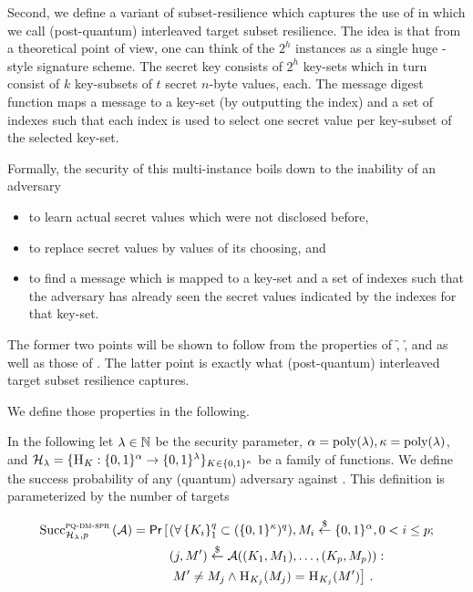 Second, we define a variant of subset-resilience which captures the use
of \fors in \spx which we call (post-quantum)  interleaved target subset resilience.
The idea is that from a theoretical point of view, one can think of the
$2^h$ \fors instances as a single huge \hors-style signature scheme.
The secret key consists of $2^h$ key-sets which in turn consist of $k$
key-subsets of $t$ secret $n$-byte values, each. The message digest function
\sphincsHmsg maps a message to a key-set (by outputting the index) and a set
of indexes such that each index is used to select one secret value per
key-subset of the selected key-set.

Formally, the security of this multi-instance \fors boils down to the inability
of an adversary
\begin{itemize}
\item to learn actual secret values which were not disclosed before,
\item to replace secret values by values of its choosing, and
\item to find a message which is mapped to a key-set and a set of indexes such that
the adversary has already seen the secret values indicated by the indexes for
that key-set.
\end{itemize}
The former two points will be shown to follow from the properties of \f, \h, and
\tfunc as well as those of \sphincsPRF. The latter point is exactly what
(post-quantum) interleaved target subset resilience captures.

We define those properties in the following.

\newline
In the following
let $\lambda\in\NN$ be the security parameter, $\alpha=\poly(\lambda),\kappa =\poly(\lambda)$, and
$\hf_\lambda = \{\h_K: \bin^{\alpha} \rightarrow \bin^\lambda\}_{K \in \bin^\kappa}$ be a
family of functions.
We define the success probability of any (quantum) adversary \A against \pqmmspr.
This definition is parameterized by the number of targets

\begin{align} \label{eqn_pqdmspr}
\succf{\pqdmspr}{\hf_\lambda, p}{\A} = \pr\left[\right.
  & (\forall \vecify{1}{q}{K_i} \subset (\bin^\kappa)^q), M_i \rand \bin^{\alpha}, 0 < i \leq p;\nonumber\\
 & (j,M') \rand \A((K_1,M_1), \ldots, (K_p,M_p)):\nonumber\\
 &\left.M'\neq M_j \wedge \h_{K_j}(M_j) = \h_{K_j}(M') \right]\,.
\end{align}

